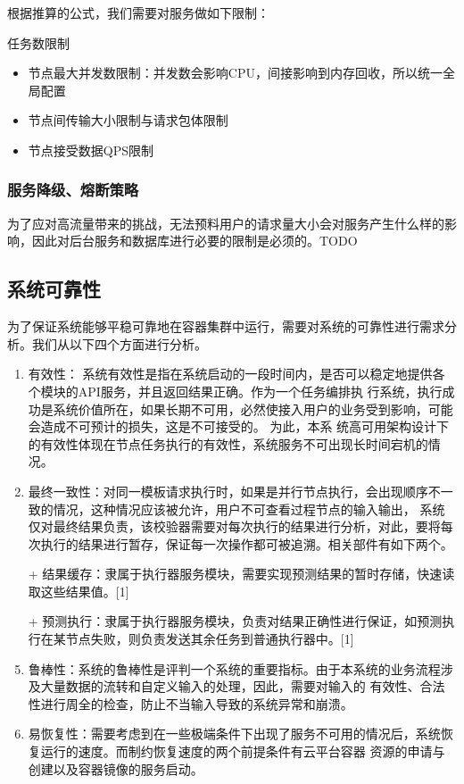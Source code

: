 根据推算的公式，我们需要对服务做如下限制：

任务数限制
\begin{itemize}
    \item 节点最大并发数限制：并发数会影响CPU，间接影响到内存回收，所以统一全局配置
    \item 节点间传输大小限制与请求包体限制
    \item 节点接受数据QPS限制
\end{itemize}

\subsubsection{服务降级、熔断策略}
为了应对高流量带来的挑战，无法预料用户的请求量大小会对服务产生什么样的影响，因此对后台服务和数据库进行必要的限制是必须的。TODO

\subsection{系统可靠性}
为了保证系统能够平稳可靠地在容器集群中运行，需要对系统的可靠性进行需求分析。我们从以下四个方面进行分析。
\begin{enumerate}
    \item 有效性： 系统有效性是指在系统启动的一段时间内，是否可以稳定地提供各个模块的API服务，并且返回结果正确。作为一个任务编排执
行系统，执行成功是系统价值所在，如果长期不可用，必然使接入用户的业务受到影响，可能会造成不可预计的损失，这是不可接受的。 为此，本系
统高可用架构设计下的有效性体现在节点任务执行的有效性，系统服务不可出现长时间宕机的情况。
    \item 最终一致性：对同一模板请求执行时，如果是并行节点执行，会出现顺序不一致的情况，这种情况应该被允许，用户不可查看过程节点的输入输出，
系统仅对最终结果负责，该校验器需要对每次执行的结果进行分析，对此，要将每次执行的结果进行暂存，保证每一次操作都可被追溯。相关部件有如下两个。
    \item[+] 结果缓存：隶属于执行器服务模块，需要实现预测结果的暂时存储，快速读取这些结果值。[1]
    \item[+] 预测执行：隶属于执行器服务模块，负责对结果正确性进行保证，如预测执行在某节点失败，则负责发送其余任务到普通执行器中。[1]
    \item 鲁棒性：系统的鲁棒性是评判一个系统的重要指标。由于本系统的业务流程涉及大量数据的流转和自定义输入的处理，因此，需要对输入的
有效性、合法性进行周全的检查，防止不当输入导致的系统异常和崩溃。
    \item 易恢复性：需要考虑到在一些极端条件下出现了服务不可用的情况后，系统恢复运行的速度。而制约恢复速度的两个前提条件有云平台容器
资源的申请与创建以及容器镜像的服务启动。
\end{enumerate}


